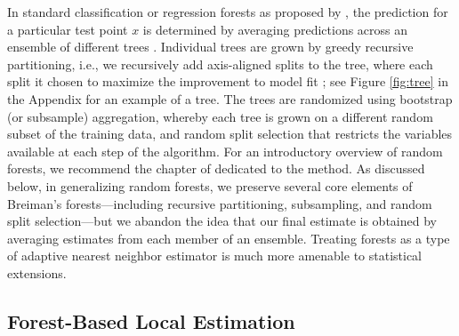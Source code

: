 \documentclass[aos]{imsart}
\theoremstyle{plain}
\theoremstyle{definition}
\theoremstyle{remark}
\begin{document}
\begin{CJK}{UTF8}{gbsn}



In standard classification or regression forests as proposed by \citet{breiman2001random}, the prediction for a
particular test point $x$ is determined by averaging predictions across an ensemble of different trees
\citep{amit1997shape,breiman1996bagging,dietterich2000experimental,ho1998random}.
Individual trees are grown by greedy recursive partitioning, i.e.,
we recursively add axis-aligned splits to the tree, where each split it chosen to maximize the
improvement to model fit \citep{breiman1984classification};
see Figure \ref{fig:tree} in the Appendix for an example of a tree. The trees are randomized using
bootstrap (or subsample) aggregation, whereby each tree is grown on a different random subset of the training data,
and random split selection that restricts the variables available at each step of the algorithm. For an introductory overview of random forests, we recommend the chapter of \citet{hastie2009elements} dedicated to the method.  As discussed below, in generalizing
random forests, we 
preserve several core elements of Breiman's forests---including recursive partitioning,
subsampling, and random split selection---but we abandon the idea that our final estimate
is obtained by averaging estimates from each member of an ensemble.
Treating forests as a type of
adaptive nearest neighbor estimator is much more amenable
to statistical extensions.

\subsection{Forest-Based Local Estimation}
\label{sec:ANN}


\end{CJK}
\end{document}
